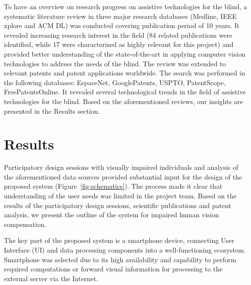 \documentclass[10pt,conference,compsocconf]{IEEEtran}
\begin{document}
To have an overview on research progress on assistive technologies for the blind, a systematic literature review in three major research databases (Medline, IEEE xplore and ACM DL) was conducted covering publication period of 10 years. It revealed increasing research interest in the field (84 related publications were identified, while 17 were characterized as highly relevant for this project) and provided better understanding of the state-of-the-art in applying computer vision technologies to address the needs of the blind. 
The review was extended to relevant patents and patent applications worldwide. The search was performed in the following databases: EspaceNet, GooglePatents, USPTO, PatentScope, FreePatentsOnline. It revealed several technological trends in the field of assistive technologies for the blind.
Based on the aforementioned reviews, our insights are presented in the Results section.




\section{Results}
\label{sec:results}

Participatory design sessions with visually impaired individuals and analysis of the aforementioned data sources provided substantial input for the design of the proposed system (Figure~\ref{fig:schematics}). The process made it clear that understanding of the user needs was limited in the project team. Based on the results of the participatory design sessions, scientific publications and patent analysis, we present the outline of the system for impaired human vision compensation. 

The key part of the proposed system is a smartphone device, connecting User Interface (UI) and data processing components into a well-functioning ecosystem. Smartphone was selected due to its high availability and capability to perform required computations or forward visual information for processing to the external server via the Internet.
\end{document}
